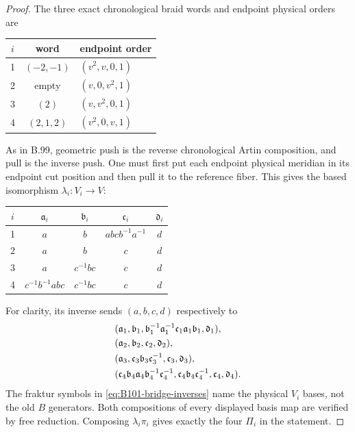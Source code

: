 \begin{proof}
The three exact chronological braid words and endpoint physical orders are
\begin{center}
\begin{tabular}{ccl}
\toprule
$i$&word&endpoint order\\
\midrule
1&$(-2,-1)$&$(v^2,v,0,1)$\\
2&empty&$(v,0,v^2,1)$\\
3&$(2)$&$(v,v^2,0,1)$\\
4&$(2,1,2)$&$(v^2,0,v,1)$\\
\bottomrule
\end{tabular}
\end{center}
As in B.99, geometric push is the reverse chronological Artin
composition, and pull is the inverse push.
One must first put each endpoint physical meridian in its endpoint
cut position and then pull it to the reference fiber.
This gives the based isomorphism $\lambda_i:V_i\to V$:
\begin{center}
\begin{tabular}{c@{\qquad}cccc}
\toprule
$i$&$\mathfrak{a}_i$&$\mathfrak{b}_i$&$\mathfrak{c}_i$&$\mathfrak{d}_i$\\
\midrule
1&$a$&$b$&$abcb^{-1}a^{-1}$&$d$\\
2&$a$&$b$&$c$&$d$\\
3&$a$&$c^{-1}bc$&$c$&$d$\\
4&$c^{-1}b^{-1}abc$&$c^{-1}bc$&$c$&$d$\\
\bottomrule
\end{tabular}
\end{center}
For clarity, its inverse sends $(a,b,c,d)$ respectively to
\begin{align}
 &(\mathfrak{a}_1,\mathfrak{b}_1,\mathfrak{b}_1^{-1}\mathfrak{a}_1^{-1}\mathfrak{c}_1\mathfrak{a}_1\mathfrak{b}_1,\mathfrak{d}_1),\notag\\
 &(\mathfrak{a}_2,\mathfrak{b}_2,\mathfrak{c}_2,\mathfrak{d}_2),\notag\\
 &(\mathfrak{a}_3,\mathfrak{c}_3\mathfrak{b}_3\mathfrak{c}_3^{-1},\mathfrak{c}_3,\mathfrak{d}_3),\notag\\
 &(\mathfrak{c}_4\mathfrak{b}_4\mathfrak{a}_4\mathfrak{b}_4^{-1}\mathfrak{c}_4^{-1},\mathfrak{c}_4\mathfrak{b}_4\mathfrak{c}_4^{-1},\mathfrak{c}_4,\mathfrak{d}_4).
 \label{eq:B101-bridge-inverses}
\end{align}
The fraktur symbols in \eqref{eq:B101-bridge-inverses} name the physical
$V_i$ bases, not the old $B$ generators.
Both compositions of every displayed basis map are verified by free
reduction.  Composing $\lambda_i\pi_i$ gives exactly the four
$\Pi_i$ in the statement.


\end{proof}
